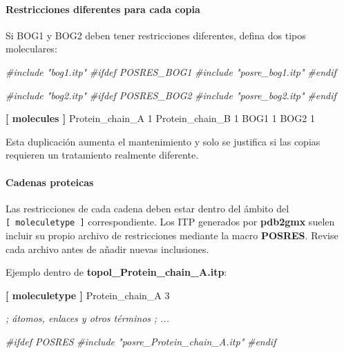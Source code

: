 \documentclass[
  spanish,
  11pt,
  a4paper]{article}
\newenvironment{Shaded}{\begin{snugshade}}{\end{snugshade}}
\newcommand{\CommentTok}[1]{\textcolor[rgb]{0.56,0.35,0.01}{\textit{#1}}}
\newcommand{\DataTypeTok}[1]{\textcolor[rgb]{0.13,0.29,0.53}{#1}}
\newcommand{\KeywordTok}[1]{\textcolor[rgb]{0.13,0.29,0.53}{\textbf{#1}}}
\begin{document}
\paragraph{Restricciones diferentes para cada
copia}\label{restricciones-diferentes-para-cada-copia}

Si BOG1 y BOG2 deben tener restricciones diferentes, defina dos tipos
moleculares:

\begin{Shaded}
\begin{Highlighting}[]
\CommentTok{\#include "bog1.itp"}
\CommentTok{\#ifdef POSRES\_BOG1}
\CommentTok{\#include "posre\_bog1.itp"}
\CommentTok{\#endif}

\CommentTok{\#include "bog2.itp"}
\CommentTok{\#ifdef POSRES\_BOG2}
\CommentTok{\#include "posre\_bog2.itp"}
\CommentTok{\#endif}
\end{Highlighting}
\end{Shaded}

\begin{Shaded}
\begin{Highlighting}[]
\KeywordTok{[ molecules ]}
\DataTypeTok{Protein\_chain\_A    1}
\DataTypeTok{Protein\_chain\_B    1}
\DataTypeTok{BOG1               1}
\DataTypeTok{BOG2               1}
\end{Highlighting}
\end{Shaded}

Esta duplicación aumenta el mantenimiento y solo se justifica si las
copias requieren un tratamiento realmente diferente.

\paragraph{Cadenas proteicas}\label{cadenas-proteicas}

Las restricciones de cada cadena deben estar dentro del ámbito del
\texttt{{[}\ moleculetype\ {]}} correspondiente. Los ITP generados por
\textbf{pdb2gmx} suelen incluir su propio archivo de restricciones
mediante la macro \textbf{POSRES}. Revise cada archivo antes de añadir
nuevas inclusiones.

Ejemplo dentro de \textbf{topol\_Protein\_chain\_A.itp}:

\begin{Shaded}
\begin{Highlighting}[]
\KeywordTok{[ moleculetype ]}
\DataTypeTok{Protein\_chain\_A    3}

\CommentTok{; átomos, enlaces y otros términos}
\CommentTok{; ...}

\CommentTok{\#ifdef POSRES}
\CommentTok{\#include "posre\_Protein\_chain\_A.itp"}
\CommentTok{\#endif}
\end{Highlighting}
\end{Shaded}
\end{document}
